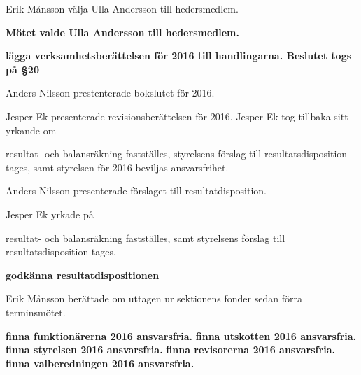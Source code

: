 \documentclass[10pt]{article}
\begin{document}
	\begin{paragrafer} \item[] %
	\begin{paragrafer}
    Erik Månsson \ypa välja Ulla Andersson till hedersmedlem.

    \textbf{Mötet valde Ulla Andersson till hedersmedlem.}
\end{paragrafer}
\textbf{\Mba lägga verksamhetsberättelsen för 2016 till handlingarna. Beslutet togs på \S20}

Anders Nilsson prestenterade bokslutet för 2016.

Jesper Ek presenterade revisionsberättelsen för 2016.
Jesper Ek tog tillbaka sitt yrkande om
\begin{attsatser}
    \att resultat- och balansräkning fastställes,
    \att styrelsens förslag till resultatsdisposition tages, samt
    \att styrelsen för 2016 beviljas ansvarsfrihet.
\end{attsatser}

Anders Nilsson presenterade förslaget till resultatdisposition.

Jesper Ek yrkade på
\begin{attsatser}
    \att resultat- och balansräkning fastställes, samt
    \att styrelsens förslag till resultatsdisposition tages.
\end{attsatser}

\Mbaby

\textbf{\Mba godkänna resultatdispositionen}

Erik Månsson berättade om uttagen ur sektionens fonder sedan förra terminsmötet.

    \begin{paragrafer}
        \textbf{\Mba finna funktionärerna 2016 ansvarsfria.}
        \textbf{\Mba finna utskotten 2016 ansvarsfria.}
        \textbf{\Mba finna styrelsen 2016 ansvarsfria.}
        \textbf{\Mba finna revisorerna 2016 ansvarsfria.}
        \textbf{\Mba finna valberedningen 2016 ansvarsfria.}


\end{paragrafer}
\end{paragrafer}
\end{document}
